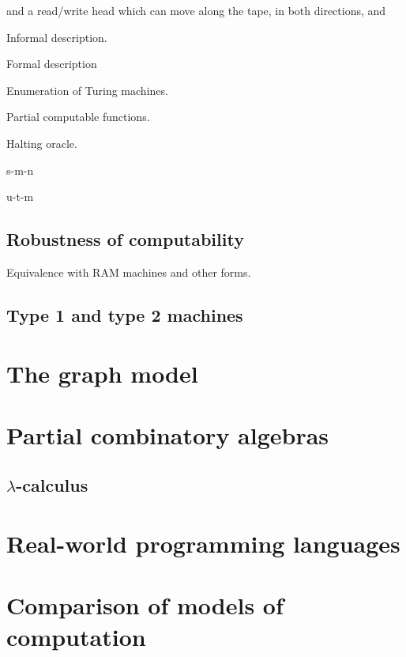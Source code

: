  and a read/write head which can
move along the tape, in both directions, and


Informal description.

Formal description

Enumeration of Turing machines.

Partial computable functions.

Halting oracle.

s-m-n

u-t-m

\subsection{Robustness of computability}
\label{sec:robustness}

Equivalence with RAM machines and other forms.


\subsection{Type 1 and type 2 machines}
\label{sec:type-1-2}


\section{The graph model}
\label{sec:graph-model}


\section{Partial combinatory algebras}
\label{sec:pcas}

\subsection{$\lambda$-calculus}
\label{sec:lambda-calculus}




\section{Real-world programming languages}
\label{sec:programming-languages}


\section{Comparison of models of computation}
\label{sec:models-comparison}




